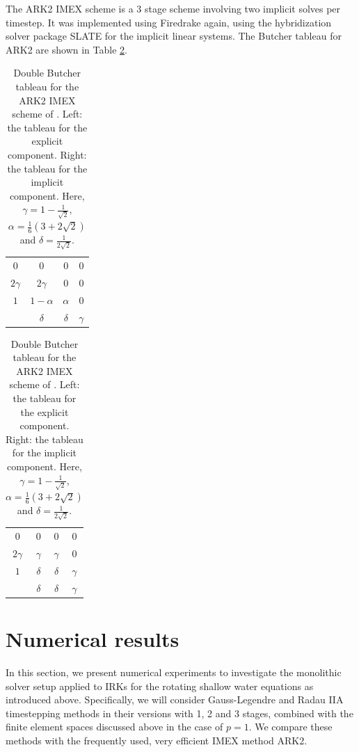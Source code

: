 \documentclass[a4paper, 12pt]{article}
\newcommand{\werner}[1]{{\color{magenta}WB says: #1}}
\begin{document}
The ARK2 IMEX scheme is a 3 stage scheme involving two implicit solves
per timestep. It was implemented using Firedrake again, using the
hybridization solver package SLATE \citep{gibson2020slate} for the
implicit linear systems. The Butcher tableau for ARK2 are shown in Table
\ref{tab:ARK2}.

\begin{table}\centering
\begin{tabular}{c|ccc}
0         &  0             &   0       & 0  \\
$2\gamma$ &  $2\gamma$     &  0        & 0  \\
$1$       & $1 - \alpha$   & $\alpha$  & 0  \\ \hline
          & $\delta$       & $\delta$  & $\gamma$
\end{tabular}
\hspace{4mm}
\begin{tabular}{c|ccc}
0         &  0             &   0       & 0  \\
$2\gamma$ &  $\gamma$     &  $\gamma$        & 0  \\
$1$       & $\delta $   & $\delta$  & $\gamma$  \\ \hline
          & $\delta$       & $\delta$  & $\gamma$
\end{tabular}
\caption{\label{tab:ARK2}Double Butcher tableau for the ARK2 IMEX scheme of
  \citet{giraldo2013implicit}. Left: the tableau for the explicit component.
  Right: the tableau for the implicit component.
   Here, $\gamma = 1 -
  \frac{1}{\sqrt{2}}$, $\alpha = \frac{1}{6} (3 + 2\sqrt{2})$ and
  $\delta = \frac{1}{ 2 \sqrt{2}}$.}
\end{table}

\section{Numerical results}
\label{sec:results}

In this section, we present numerical experiments to investigate the
monolithic solver setup applied to IRKs for the rotating shallow water
equations as introduced above. Specifically, we will consider Gauss-Legendre and Radau IIA timestepping methods in their versions with 1,
2 and 3 stages, combined with the finite element spaces discussed
above in the case of $p=1$. We compare these methods with the
frequently used, very efficient IMEX method ARK2.
\end{document}
